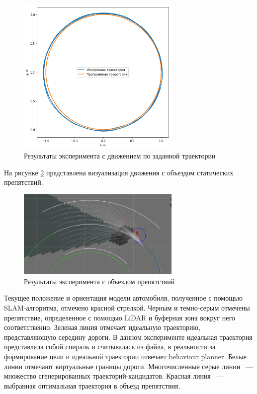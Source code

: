 \begin{figure}[h]
    \centering
    \includegraphics[width=0.7\textwidth]{images/path_moving_test}
    \caption{Результаты эксперимента с движением по заданной траектории}
    \label{img:path_moving_test}
\end{figure}

На рисунке \ref{img:obstacle_avoidance} представлена визуализация движения с объездом статических
препятствий.

\begin{figure}[h]
    \centering
    \includegraphics[width=0.7\textwidth]{images/obstacle_avoidance}
    \caption{Результаты эксперимента с объездом препятствий}
    \label{img:obstacle_avoidance}
\end{figure}

Текущее положение и ориентация модели автомобиля, полученное с помощью SLAM-алгоритма, отмечено
красной стрелкой. Черным и темно-серым отмечены препятствие, определенное с помощью LiDAR и буферная
зона вокруг него соответственно. Зеленая линия отмечает идеальную траекторию, представляющую
середину дороги. В данном эксперименте идеальная траектория представляла собой спираль и считывалась
из файла, в реальности за формирование цели и идеальной траектории отвечает behaviour planner.
Белые линии отмечают виртуальные границы дороги. Многочисленные серые линии ~--- множество
сгенерированных траекторий-кандидатов. Красная линия ~--- выбранная оптимальная траектория
в объезд препятствия.



